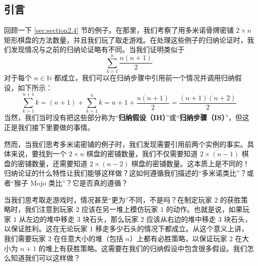 \subsection{引言}

回顾一下 \ref{sec:section2.4} 节的例子。在那里，我们考察了用多米诺骨牌密铺 $2 \times n$ 矩形棋盘的方法数量，并且我们玩了取走游戏。在处理这些例子的归纳论证时，我们发现情况与之前的归纳论证略有不同。当我们证明类似于
\[\sum_{k=1}^{n} \frac{n(n+1)}{2}\]
对于每个 $n \in \mathbb{N}$ 都成立，我们可以在归纳步骤中引用前一个情况并调用归纳假设，如下所示：
\[\sum_{k=1}^{n+1} k=(n+1)+\sum_{k=1}^{n}k = n+1+\frac{n(n+1)}{2} = \frac{(n+1)(n+2)}{2} \]
当然，我们当时没有把这些部分称为``\textbf{归纳假设（IH）}''或``\textbf{归纳步骤（IS）}''，但这正是我们接下里要做的事情。

然而，当我们思考多米诺密铺的例子时，我们发现需要引用前两个实例的事实。具体来说，要找到一个 $2 \times n$ 棋盘的密铺数量，我们不仅需要知道 $2 \times (n-1)$ 棋盘的密铺数量，还需要知道 $2 \times (n-2)$ 棋盘的密铺数量。这本质上是不同的！归纳论证的什么特性让我们能够这样做？这如何遵循我们描述的``多米诺类比''？或者``猴子 Mojo 类比''？它是否真的遵循？

当我们思考取走游戏时，情况甚至``更为''不同，不是吗？在制定玩家 $2$ 的获胜策略时，我们注意到玩家 $2$ 应该在另一堆上模仿玩家 $1$ 的动作。也就是说，如果玩家 $1$ 从左边的堆中移走 $3$ 块石头，那么玩家 $2$ 应该从右边的堆中移走 $3$ 块石头，以保证胜利。这在无论玩家 $1$ 移走多少石头的情况下都成立。从这个意义上讲，我们需要玩家 $2$ 在任意大小的堆（包括 $n$）上都有必胜策略，以保证玩家 $2$ 在大小为 $n + 1$ 的堆上有获胜策略。这需要在我们的归纳假设中包含很多假设。我们怎么知道我们可以这样做？
